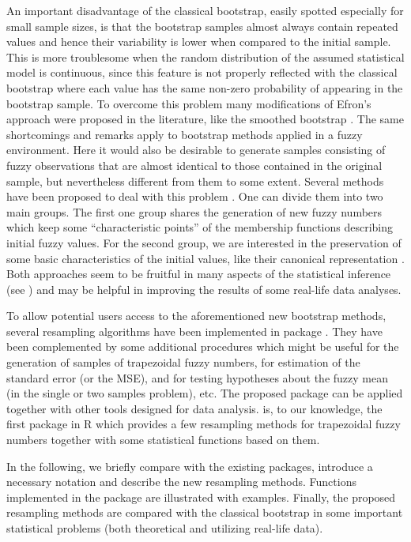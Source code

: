 An important disadvantage of the classical bootstrap, easily spotted especially for small sample sizes, is that the bootstrap samples almost always contain repeated values and hence their variability is lower when compared to the initial sample.
This is more troublesome when the random distribution of the assumed statistical model is continuous, since this feature is not properly reflected with the classical bootstrap where each value has the same non-zero probability of appearing in the bootstrap sample. To overcome this problem many modifications of Efron's approach were proposed in the literature, like the smoothed bootstrap \citep{Silverman}. 
The same shortcomings and remarks apply to bootstrap methods applied in a fuzzy environment. Here it would also be desirable to generate samples consisting of fuzzy observations that are almost identical to those contained in the original sample, but nevertheless different from them to some extent. 
Several methods have been proposed to deal with this problem \citep{GrzegorzewskiRom2021}. One can divide them into two main groups. The first one group shares the generation of new fuzzy numbers which keep some ``characteristic points'' of the membership functions describing initial fuzzy values. 
For the second group, we are interested in the preservation of some basic characteristics of the initial values, like their canonical representation \citep{delgado}.
Both approaches seem to be fruitful in many aspects of the statistical inference (see \cite{grzegorzewski2019,grzegorzewski_ijcis2020,grzegorzewski_amcs2020,GrzegorzewskiRom2021,romaniuk2019,romaniuk_hryniewicz}) and may be helpful in improving the results
of some real-life data analyses.

To allow potential users access to the aforementioned new bootstrap methods, several resampling algorithms have been implemented in  package \citep{FuzzyResamplingMan}. They have been complemented by some additional procedures which might be useful for the generation of samples of trapezoidal fuzzy numbers, for estimation of the standard error (or the MSE), and for testing hypotheses about the fuzzy mean (in the single or two samples problem), etc. 
The proposed package can be applied together with other tools designed for data analysis.
 is, to our knowledge, the first package in R \citep{RMan} which provides a few resampling methods for trapezoidal fuzzy numbers together with some statistical functions based on them.

In the following, we briefly compare  with the existing packages, introduce a necessary notation and describe the new resampling methods.
Functions implemented in the package are illustrated with examples.
Finally, the proposed resampling methods are compared with the classical bootstrap in some important statistical problems (both theoretical and utilizing real-life data).



